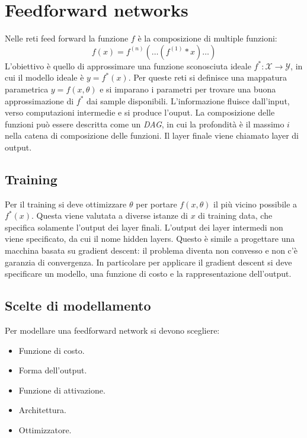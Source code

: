 \section{Feedforward networks}
Nelle reti feed forward la funzione $f$ \`e la composizione di multiple funzioni:
$$f(x) = f^{(n)}(\dots(f^{(1)}*x)\dots)$$
L'obiettivo \`e quello di approssimare una funzione sconosciuta ideale $f^*:\mathcal{X}\rightarrow\mathcal{Y}$, in cui il modello ideale \`e $y = f^*(x)$.
Per queste reti si definisce una mappatura parametrica $y = f(x,\theta)$ e si imparano i parametri per trovare una buona approssimazione di $f^*$ dai sample disponibili.
L'informazione fluisce dall'input, verso computazioni intermedie e si produce l'ouput.
La composizione delle funzioni pu\`o essere descritta come un \emph{DAG}, in cui la profondit\`a \`e il massimo $i$ nella catena di composizione delle funzioni.
Il layer finale viene chiamato layer di output.

	\subsection{Training}
	Per il training si deve ottimizzare $\theta$ per portare $f(x,\theta)$ il pi\`u vicino possibile a $f^*(x)$.
	Questa viene valutata a diverse istanze di $x$ di training data, che specifica solamente l'output dei layer finali.
	L'output dei layer intermedi non viene specificato, da cui il nome hidden layers.
	Questo \`e simile a progettare una macchina basata su gradient descent: il problema diventa non convesso e non c'\`e garanzia di convergenza.
	In particolare per applicare il gradient descent si deve specificare un modello, una funzione di costo e la rappresentazione dell'output.

	\subsection{Scelte di modellamento}
	Per modellare una feedforward network si devono scegliere:
	\begin{multicols}{2}
		\begin{itemize}
			\item Funzione di costo.
			\item Forma dell'output.
			\item Funzione di attivazione.
			\item Architettura.
			\item Ottimizzatore.
		\end{itemize}
	\end{multicols}

